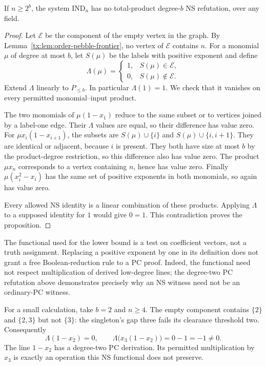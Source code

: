 \begin{proposition}
\label{tx:prop:order-induction-lower}
If $n\ge2^b$, the system $\mathrm{IND}_n$ has no total-product
degree-$b$ NS refutation, over any field.
\end{proposition}
\begin{proof}
Let $\mathcal E$ be the component of the empty vertex in the graph.
By Lemma~\ref{tx:lem:order-pebble-frontier}, no vertex of $\mathcal E$
contains $n$. For a monomial $\mu$ of degree at most $b$, let $S(\mu)$
be the labels with positive exponent and define
\[
 \Lambda(\mu)=
 \begin{cases}1,&S(\mu)\in\mathcal E,\\0,&S(\mu)\notin\mathcal E.
 \end{cases}
\]
Extend $\Lambda$ linearly to $P_{\le b}$. In particular $\Lambda(1)=1$.
We check that it vanishes on every permitted monomial--input product.

The two monomials of $\mu(1-x_1)$ reduce to the same subset or to
vertices joined by a label-one edge. Their $\Lambda$ values are equal,
so their difference has value zero. For
$\mu x_i(1-x_{i+1})$, the subsets are
$S(\mu)\cup\{i\}$ and $S(\mu)\cup\{i,i+1\}$. They are identical
or adjacent, because $i$ is present. They both have size at most $b$
by the product-degree restriction, so this difference also has value
zero. The product $\mu x_n$ corresponds to a vertex containing $n$,
hence has value zero. Finally $\mu(x_i^2-x_i)$ has the same set of
positive exponents in both monomials, so again has value zero.

Every allowed NS identity is a linear combination of these products.
Applying $\Lambda$ to a supposed identity for $1$ would give $0=1$.
This contradiction proves the proposition.
\end{proof}

The functional used for the lower bound is a test on coefficient vectors, not a truth
assignment. Replacing a positive exponent by one in its definition
does not grant a free Boolean-reduction rule to a PC proof.
Indeed, the functional need not respect multiplication of derived
low-degree lines; the degree-two PC refutation above demonstrates
precisely why an NS witness need not be an ordinary-PC witness.

For a small calculation, take $b=2$ and $n\ge4$. The empty component
contains $\{2\}$ and $\{2,3\}$ but not $\{3\}$: the singleton's gap
three fails its clearance threshold two. Consequently
\[
 \Lambda(1-x_2)=0,\qquad
 \Lambda\bigl(x_3(1-x_2)\bigr)=0-1=-1\ne0.
\]
The line $1-x_2$ has a degree-two PC derivation. Its permitted
multiplication by $x_3$ is exactly an operation this NS functional does
not preserve.


